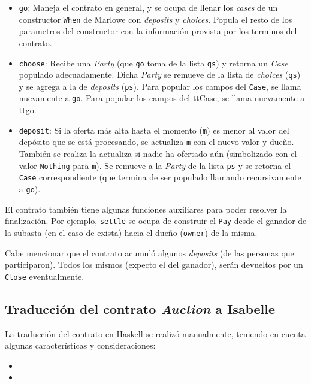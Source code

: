 \documentclass[12pt]{book}
\begin{document}
\begin{itemize}
    \item \texttt{go}: Maneja el contrato en general, y se ocupa de llenar los \textit{cases} de un constructor \texttt{When} de Marlowe con \textit{deposits} y \textit{choices}. Popula el resto de los parametros del constructor con la información provista por los terminos del contrato.
    \item \texttt{choose}: Recibe una \textit{Party} (que \texttt{go} toma de la lista \texttt{qs}) y retorna un \textit{Case} populado adecuadamente. Dicha \textit{Party} se remueve de la lista de \textit{choices} (\texttt{qs}) y se agrega a la de \textit{deposits} (\texttt{ps}). Para popular los campos del \texttt{Case}, se llama nuevamente a \texttt{go}. Para popular los campos del ttCase, se llama nuevamente a ttgo.
    \item \texttt{deposit}: Si la oferta más alta hasta el momento (\texttt{m}) es menor al valor del depósito que se está procesando, se actualiza \texttt{m} con el nuevo valor y dueño. También se realiza la actualiza si nadie ha ofertado aún (simbolizado con el valor \texttt{Nothing} para \texttt{m}). Se remueve a la \textit{Party} de la lista \texttt{ps} y se retorna el \texttt{Case} correspondiente (que termina de ser populado llamando recursivamente a \texttt{go}).
\end{itemize}

El contrato también tiene algunas funciones auxiliares para poder resolver la finalización. Por ejemplo, \texttt{settle} se ocupa de construir el \texttt{Pay} desde el ganador de la subasta (en el caso de exista) hacia el dueño (\texttt{owner}) de la misma.

Cabe mencionar que el contrato acumuló algunos \textit{deposits} (de las personas que participaron). Todos los mismos (expecto el del ganador), serán devueltos por un \texttt{Close} eventualmente.


\subsection{Traducción del contrato \textit{Auction} a Isabelle}

La traducción del contrato en Haskell se realizó manualmente, teniendo en cuenta algunas características y consideraciones:

\begin{itemize}
    \item 
    \item
\end{itemize}
\end{document}
